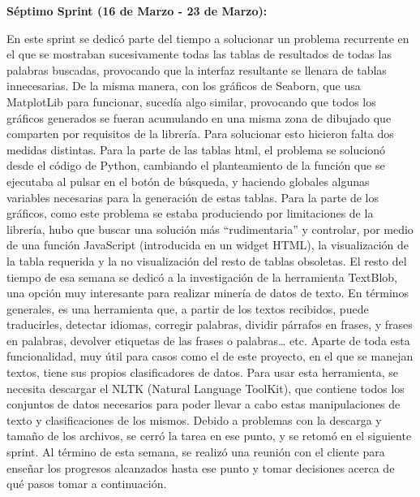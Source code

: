

\textbf{Séptimo Sprint (16 de Marzo - 23 de Marzo):}

En este sprint se dedicó parte del tiempo a solucionar un problema recurrente en el que se mostraban sucesivamente todas las tablas de resultados de todas las palabras buscadas, provocando que la interfaz resultante se llenara de tablas innecesarias. De la misma manera, con los gráficos de Seaborn, que usa MatplotLib para funcionar, sucedía algo similar, provocando que todos los gráficos generados se fueran acumulando en una misma zona de dibujado que comparten por requisitos de la librería.
Para solucionar esto hicieron falta dos medidas distintas. Para la parte de las tablas html, el problema se solucionó desde el código de Python, cambiando el planteamiento de la función que se ejecutaba al pulsar en el botón de búsqueda, y haciendo globales algunas variables necesarias para la generación de estas tablas. Para la parte de los gráficos, como este problema se estaba produciendo por limitaciones de la librería, hubo que buscar una solución más “rudimentaria” y controlar, por medio de una función JavaScript (introducida en un widget HTML), la visualización de la tabla requerida y la no visualización del resto de tablas obsoletas.
El resto del tiempo de esa semana se dedicó a la investigación de la herramienta TextBlob, una opción muy interesante para realizar minería de datos de texto. En términos generales, es una herramienta que, a partir de los textos recibidos, puede traducirles, detectar idiomas, corregir palabras, dividir párrafos en frases, y frases en palabras, devolver etiquetas de las frases o palabras… etc. Aparte de toda esta funcionalidad, muy útil para casos como el de este proyecto, en el que se manejan textos, tiene sus propios clasificadores de datos. 
Para usar esta herramienta, se necesita descargar el NLTK (Natural Language ToolKit), que contiene todos los conjuntos de datos necesarios para poder llevar a cabo estas manipulaciones de texto y clasificaciones de los mismos. 
Debido a problemas con la descarga y tamaño de los archivos, se cerró la tarea en ese punto, y se retomó en el siguiente sprint.
Al término de esta semana, se realizó una reunión con el cliente para enseñar los progresos alcanzados hasta ese punto y tomar decisiones acerca de qué pasos tomar a continuación. 


